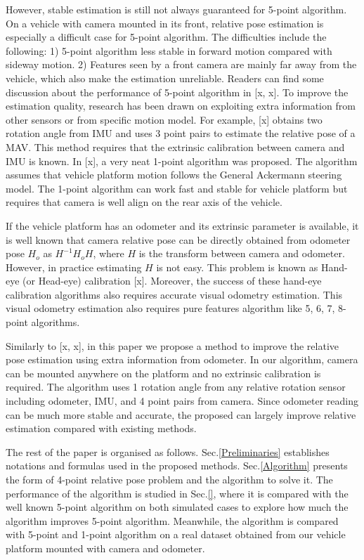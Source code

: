 \documentclass[letterpaper, 10 pt, conference]{ieeeconf}
\begin{document}
However, stable estimation is still not always guaranteed for 5-point algorithm. On a vehicle with camera mounted in its front, relative pose estimation is especially a difficult case for 5-point algorithm. The difficulties include the following: 1) 5-point algorithm less stable in forward motion compared with sideway motion. 2) Features seen by a front camera are mainly far away from the vehicle, which also make the estimation unreliable. Readers can find some discussion about the performance of 5-point algorithm in [x, x]. To improve the estimation quality, research has been drawn on exploiting extra information from other sensors or from specific motion model. For example, [x] obtains two rotation angle from IMU and uses 3 point pairs to estimate the relative pose of a MAV. This method requires that the extrinsic calibration between camera and IMU is known. In [x], a very neat 1-point algorithm was proposed. The algorithm assumes that vehicle platform motion follows the General Ackermann steering model. The 1-point algorithm can work fast and stable for vehicle platform but requires that camera is well align on the rear axis of the vehicle. 

If the vehicle platform has an odometer and its extrinsic parameter is available, it is well known that camera relative pose can be directly obtained from odometer pose $H_o$ as $H^{-1} H_o H$, where $H$ is the transform between camera and odometer. However, in practice estimating $H$ is not easy. This problem is known as Hand-eye (or Head-eye) calibration [x]. Moreover, the success of these hand-eye calibration algorithms also requires accurate visual odometry estimation. This visual odometry estimation also requires pure features algorithm like 5, 6, 7, 8-point algorithms. 

Similarly to [x, x], in this paper we propose a method to improve the relative pose estimation using extra information from odometer. In our algorithm, camera can be mounted anywhere on the platform and no extrinsic calibration is required. The algorithm uses 1 rotation angle from any relative rotation sensor including odometer, IMU, and 4 point pairs from camera. Since odometer reading can be much more stable and accurate, the proposed can largely improve relative estimation compared with existing methods. 

The rest of the paper is organised as follows. Sec.\ref{Preliminaries} establishes notations and formulas used in the proposed methods. Sec.\ref{Algorithm} presents the form of 4-point relative pose problem and the algorithm to solve it. The performance of the algorithm is studied in Sec.\ref{}, where it is compared with the well known 5-point algorithm on both simulated cases to explore how much the algorithm improves 5-point algorithm. Meanwhile, the algorithm is compared with 5-point and 1-point algorithm on a real dataset obtained from our vehicle platform mounted with camera and odometer. 
\end{document}
